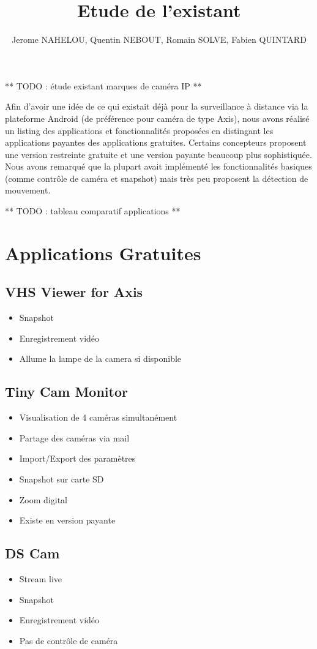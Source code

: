 \documentclass[a4paper,10pt]{report}
\begin{document}
\title{Etude de l'existant}
\author{Jerome NAHELOU, Quentin NEBOUT, Romain SOLVE, Fabien QUINTARD}

** TODO : étude existant marques de caméra IP **

Afin d'avoir une idée de ce qui existait déjà pour la surveillance à distance via la plateforme Android (de préférence pour caméra de type Axis), nous avons réalisé un listing des applications
et fonctionnalités proposées en distingant les applications payantes des applications gratuites. Certains concepteurs proposent une version restreinte gratuite et une version payante beaucoup
plus sophistiquée. Nous avons remarqué que la plupart avait implémenté les fonctionnalités basiques (comme contrôle de caméra et snapshot) mais très peu proposent la détection de mouvement.

** TODO : tableau comparatif applications **

\chapter{Applications Gratuites}
\section{VHS Viewer for Axis}
\begin{itemize}
  \item Snapshot
  \item Enregistrement vidéo
  \item Allume la lampe de la camera si disponible
\end{itemize}

\section{Tiny Cam Monitor}
\begin{itemize}
  \item Visualisation de 4 caméras simultanément
  \item Partage des caméras via mail
  \item Import/Export des paramètres
  \item Snapshot sur carte SD
  \item Zoom digital
  \item Existe en version payante
\end{itemize}

\section{DS Cam}
\begin{itemize}
  \item Stream live
  \item Snapshot
  \item Enregistrement vidéo
  \item Pas de contrôle de caméra
\end{itemize}
\end{document}
